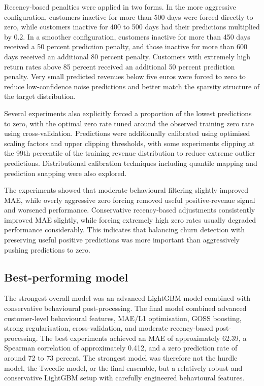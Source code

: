 Recency-based penalties were applied in two forms. In the more aggressive configuration, customers inactive for more than 500 days were forced directly to zero, while customers inactive for 400 to 500 days had their predictions multiplied by 0.2. In a smoother configuration, customers inactive for more than 450 days received a 50 percent prediction penalty, and those inactive for more than 600 days received an additional 80 percent penalty. Customers with extremely high return rates above 85 percent received an additional 50 percent prediction penalty. Very small predicted revenues below five euros were forced to zero to reduce low-confidence noise predictions and better match the sparsity structure of the target distribution.

Several experiments also explicitly forced a proportion of the lowest predictions to zero, with the optimal zero rate tuned around the observed training zero rate using cross-validation. Predictions were additionally calibrated using optimised scaling factors and upper clipping thresholds, with some experiments clipping at the 99th percentile of the training revenue distribution to reduce extreme outlier predictions. Distributional calibration techniques including quantile mapping and prediction snapping were also explored.

The experiments showed that moderate behavioural filtering slightly improved MAE, while overly aggressive zero forcing removed useful positive-revenue signal and worsened performance. Conservative recency-based adjustments consistently improved MAE slightly, while forcing extremely high zero rates usually degraded performance considerably. This indicates that balancing churn detection with preserving useful positive predictions was more important than aggressively pushing predictions to zero.

\subsection{Best-performing model}
The strongest overall model was an advanced LightGBM model combined with conservative behavioural post-processing. The final model combined advanced customer-level behavioural features, MAE/L1 optimisation, GOSS boosting, strong regularisation, cross-validation, and moderate recency-based post-processing. The best experiments achieved an MAE of approximately 62.39, a Spearman correlation of approximately 0.412, and a zero prediction rate of around 72 to 73 percent. The strongest model was therefore not the hurdle model, the Tweedie model, or the final ensemble, but a relatively robust and conservative LightGBM setup with carefully engineered behavioural features.

